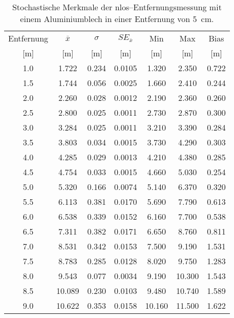 \begin{appendices}
\begin{table}[h]
	\centering
	\begin{tabular}{||c||ccc||cc||c||}
\hline
Entfernung & $\overline{x}$ & $\sigma$ & $SE_{\overline{x}}$ & Min & Max & Bias \\
{[}\si{\meter}{]} & {[}\si{\meter}{]} & {[}\si{\meter}{]} & {[}\si{\meter}{]} & {[}\si{\meter}{]} & {[}\si{\meter}{]} & {[}\si{\meter}{]} \\
\hline
\hline
\num{1.0} & \num{1.722} & \num{0.234} & \num{0.0105} & \num{1.320} & \num{2.350} & \num{0.722} \\
\num{1.5} & \num{1.744} & \num{0.056} & \num{0.0025} & \num{1.660} & \num{2.410} & \num{0.244} \\
\num{2.0} & \num{2.260} & \num{0.028} & \num{0.0012} & \num{2.190} & \num{2.360} & \num{0.260} \\
\num{2.5} & \num{2.800} & \num{0.025} & \num{0.0011} & \num{2.730} & \num{2.870} & \num{0.300} \\
\num{3.0} & \num{3.284} & \num{0.025} & \num{0.0011} & \num{3.210} & \num{3.390} & \num{0.284} \\
\num{3.5} & \num{3.803} & \num{0.034} & \num{0.0015} & \num{3.730} & \num{4.290} & \num{0.303} \\
\num{4.0} & \num{4.285} & \num{0.029} & \num{0.0013} & \num{4.210} & \num{4.380} & \num{0.285} \\
\num{4.5} & \num{4.754} & \num{0.033} & \num{0.0015} & \num{4.660} & \num{5.030} & \num{0.254} \\
\num{5.0} & \num{5.320} & \num{0.166} & \num{0.0074} & \num{5.140} & \num{6.370} & \num{0.320} \\
\num{5.5} & \num{6.113} & \num{0.381} & \num{0.0170} & \num{5.690} & \num{7.790} & \num{0.613} \\
\num{6.0} & \num{6.538} & \num{0.339} & \num{0.0152} & \num{6.160} & \num{7.700} & \num{0.538} \\
\num{6.5} & \num{7.311} & \num{0.382} & \num{0.0171} & \num{6.650} & \num{8.760} & \num{0.811} \\
\num{7.0} & \num{8.531} & \num{0.342} & \num{0.0153} & \num{7.500} & \num{9.190} & \num{1.531} \\
\num{7.5} & \num{8.783} & \num{0.285} & \num{0.0128} & \num{8.020} & \num{9.750} & \num{1.283} \\
\num{8.0} & \num{9.543} & \num{0.077} & \num{0.0034} & \num{9.190} & \num{10.300} & \num{1.543} \\
\num{8.5} & \num{10.089} & \num{0.230} & \num{0.0103} & \num{9.480} & \num{10.740} & \num{1.589} \\
\num{9.0} & \num{10.622} & \num{0.353} & \num{0.0158} & \num{10.160} & \num{11.500} & \num{1.622} \\
\hline
	\end{tabular}
	\caption{Stochastische Merkmale der \Gls{nlos}--Entfernungsmessung mit einem Aluminiumblech in einer Entfernung von \SI{5}{\centi\meter}.}
	\label{tab:entfernungsmessung_2018_01_20_nlos_metal2}
\end{table}



\end{appendices}
